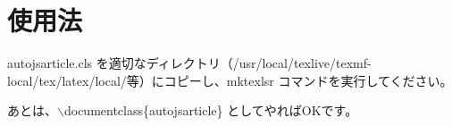\documentclass{autojsarticle}
\begin{document}
\section{使用法}

autojsarticle.cls を適切なディレクトリ（\slash usr\slash local\slash  texlive\slash texmf-local\slash tex\slash latex\slash local\slash 等）にコピーし、mktexlsr コマンドを実行してください。

あとは、$\backslash$documentclass\{autojsarticle\} としてやればOKです。
\end{document}
